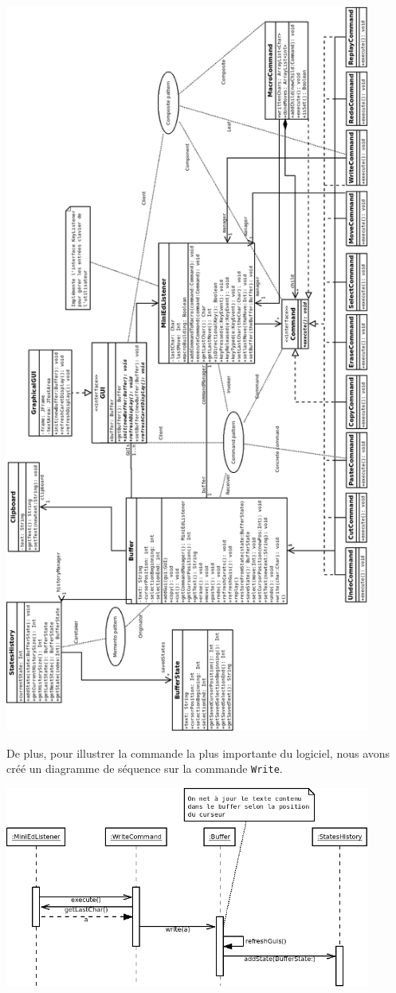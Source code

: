 \documentclass[a4paper]{article}
\begin{document}
	\begin{center}
		\includegraphics[width=0.9\textwidth]{UML.png}~
	\end{center}

		De plus, pour illustrer la commande la plus importante du logiciel, nous avons créé un diagramme de séquence sur la commande \texttt{Write}.

	\begin{center}
		\includegraphics[width=0.9\textwidth]{WriteSeq.png}~
	\end{center}
	\newpage
	
\end{document}
